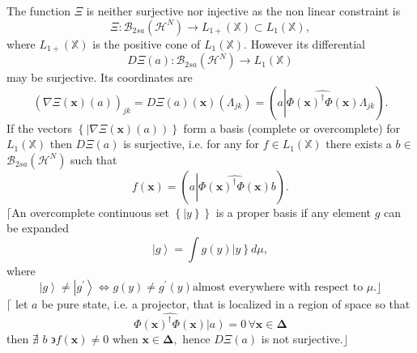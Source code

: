 \documentclass[aps,preprint]{revtex4}%
\begin{document}
The function $\Xi$ is neither surjective nor injective as the non linear
constraint is
\begin{equation}
\Xi:\mathcal{B}_{2sa}\left(  \mathcal{H}^{N}\right)  \rightarrow L_{1+}\left(
\mathbb{X}\right)  \subset L_{1}\left(  \mathbb{X}\right)  ,
\end{equation}
where $L_{1+}\left(  \mathbb{X}\right)  $ is the positive cone of
$L_{1}\left(  \mathbb{X}\right)  .$ However its differential
\begin{equation}
D\Xi\left(  a\right)  :\mathcal{B}_{2sa}\left(  \mathcal{H}^{N}\right)
\rightarrow L_{1}\left(  \mathbb{X}\right)
\end{equation}
may be surjective. Its coordinates are
\begin{equation}
\left(  \overset{}{\nabla\Xi\left(  \mathbf{x}\right)  \left(  a\right)
}\right)  _{jk}=D\Xi\left(  a\right)  \left(  \mathbf{x}\right)  \left(
\Lambda_{jk}\right)  =\left(  a\left\vert \widehat{\Phi\left(  \mathbf{x}%
\right)  ^{\dagger}\Phi\left(  \mathbf{x}\right)  }\right.  \Lambda
_{jk}\right)  .
\end{equation}
If the vectors $\left\{  \left\vert \nabla\Xi\left(  \mathbf{x}\right)
\left(  a\right)  \right)  \right\}  $ form a basis (complete or overcomplete)
for $L_{1}\left(  \mathbb{X}\right)  $ then $D\Xi\left(  a\right)  $ is
surjective, i.e. for any for $f\in L_{1}\left(  \mathbb{X}\right)  $ there
exists a $b\in$ $\mathcal{B}_{2sa}\left(  \mathcal{H}^{N}\right)  $ such that
\begin{equation}
f\left(  \mathbf{x}\right)  =\left(  a\left\vert \widehat{\Phi\left(
\mathbf{x}\right)  ^{\dagger}\Phi\left(  \mathbf{x}\right)  }\right.
b\right)  \mathbf{.}%
\end{equation}
$\lceil$An overcomplete continuous set $\left\{  \left\vert y\right\}
\right\}  $ is a proper basis if any element $g$ can be expanded
\begin{equation}
\left\vert g\right\rangle =\int g\left(  y\right)  \left\vert y\right\}  d\mu,
\end{equation}
where
\begin{equation}
\left\vert g\right\rangle \neq\left\vert g^{\prime}\right\rangle
\Leftrightarrow g\left(  y\right)  \neq g^{\prime}\left(  y\right)  \text{
almost everywhere with respect to }\mu.\rfloor
\end{equation}
$\lceil$ let $a$ be pure state, i.e. a projector, that is localized in a
region of space so that
\begin{equation}
\widehat{\Phi\left(  \mathbf{x}\right)  ^{\dagger}\Phi\left(  \mathbf{x}%
\right)  }\left\vert \overset{}{a}\right)  =0\,\forall\mathbf{x\in\Delta}%
\end{equation}
then $\nexists$ $b$ $\backepsilon f\left(  \mathbf{x}\right)  \neq0$ when
$\mathbf{x\in\Delta,}$ hence $D\Xi\left(  a\right)  $ is not
surjective.$\mathbf{\rfloor}$
\end{document}
